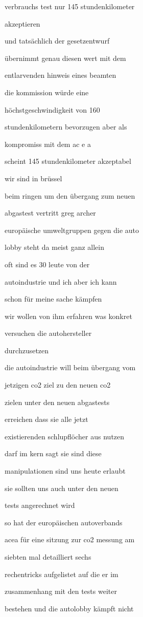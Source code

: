 \documentclass[a4paper, 11pt]{book} %
\begin{document}
verbrauchs test nur 145 stundenkilometer

akzeptieren

und tatsächlich der gesetzentwurf

übernimmt genau diesen wert mit dem

entlarvenden hinweis eines beamten

die kommission würde eine

höchstgeschwindigkeit von 160

stundenkilometern bevorzugen aber als

kompromiss mit dem ac e a

scheint 145 stundenkilometer akzeptabel

wir sind in brüssel

beim ringen um den übergang zum neuen

abgastest vertritt greg archer

europäische umweltgruppen gegen die auto

lobby steht da meist ganz allein

oft sind es 30 leute von der

autoindustrie und ich aber ich kann

schon für meine sache kämpfen

wir wollen von ihm erfahren was konkret

versuchen die autohersteller

durchzusetzen

die autoindustrie will beim übergang vom

jetzigen co2 ziel zu den neuen co2

zielen unter den neuen abgastests

erreichen dass sie alle jetzt

existierenden schlupflöcher aus nutzen

darf im kern sagt sie sind diese

manipulationen sind uns heute erlaubt

sie sollten uns auch unter den neuen

tests angerechnet wird

so hat der europäischen autoverbands

acea für eine sitzung zur co2 messung am

siebten mal detailliert sechs

rechentricks aufgelistet auf die er im

zusammenhang mit den tests weiter

bestehen und die autolobby kämpft nicht
\end{document}
